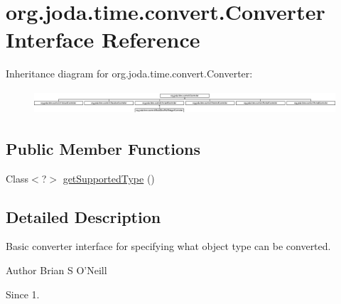 \hypertarget{interfaceorg_1_1joda_1_1time_1_1convert_1_1_converter}{\section{org.\-joda.\-time.\-convert.\-Converter Interface Reference}
\label{interfaceorg_1_1joda_1_1time_1_1convert_1_1_converter}
}
Inheritance diagram for org.\-joda.\-time.\-convert.\-Converter\-:\begin{figure}[H]
\begin{center}
\leavevmode
\includegraphics[height=0.872274cm]{interfaceorg_1_1joda_1_1time_1_1convert_1_1_converter}
\end{center}
\end{figure}
\subsection*{Public Member Functions}
\begin{DoxyCompactItemize}
\item 
Class$<$?$>$ \hyperlink{interfaceorg_1_1joda_1_1time_1_1convert_1_1_converter_ae111fe1ae8bc5c6d3dbdc9912febbf9c}{get\-Supported\-Type} ()
\end{DoxyCompactItemize}


\subsection{Detailed Description}
Basic converter interface for specifying what object type can be converted.

\begin{DoxyAuthor}{Author}
Brian S O'Neill 
\end{DoxyAuthor}
\begin{DoxySince}{Since}
1. 
\end{DoxySince}


